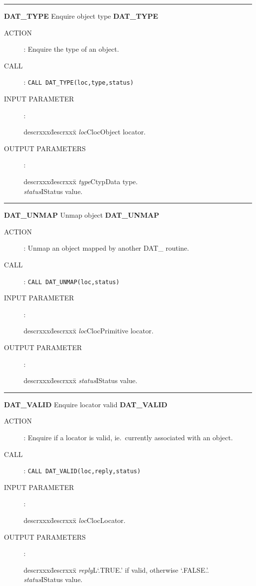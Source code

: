 \goodbreak
\rule{\textwidth}{0.3mm}
{\Large {\bf DAT\_TYPE} \hfill Enquire object type \hfill {\bf DAT\_TYPE}}
\begin{description}
\item [ACTION]:
Enquire the type of an object.
\item [CALL]:
{\tt CALL DAT\_TYPE(loc,type,status)}
\item [INPUT PARAMETER]:
\begin{tabbing}
descrxxx\=descrxxx\=\kill
{\em loc}\>Cloc\>Object locator.
\end{tabbing}
\item [OUTPUT PARAMETERS]:
\begin{tabbing}
descrxxx\=descrxxx\=\kill
{\em type}\>Ctyp\>Data type.\\
{\em status}\>I\>Status value.
\end{tabbing}
\end{description}
\goodbreak
\rule{\textwidth}{0.3mm}
{\Large {\bf DAT\_UNMAP} \hfill Unmap object \hfill {\bf DAT\_UNMAP}}
\begin{description}
\item [ACTION]:
Unmap an object mapped by another DAT\_ routine.
\item [CALL]:
{\tt CALL DAT\_UNMAP(loc,status)}
\item [INPUT PARAMETER]:
\begin{tabbing}
descrxxx\=descrxxx\=\kill
{\em loc}\>Cloc\>Primitive locator.
\end{tabbing}
\item [OUTPUT PARAMETER]:
\begin{tabbing}
descrxxx\=descrxxx\=\kill
{\em status}\>I\>Status value.
\end{tabbing}
\end{description}
\goodbreak
\rule{\textwidth}{0.3mm}
{\Large {\bf DAT\_VALID} \hfill Enquire locator valid \hfill {\bf DAT\_VALID}}
\begin{description}
\item [ACTION]:
Enquire if a locator is valid, ie.\ currently associated with an object.
\item [CALL]:
{\tt CALL DAT\_VALID(loc,reply,status)}
\item [INPUT PARAMETER]:
\begin{tabbing}
descrxxx\=descrxxx\=\kill
{\em loc}\>Cloc\>Locator.
\end{tabbing}
\item [OUTPUT PARAMETERS]:
\begin{tabbing}
descrxxx\=descrxxx\=\kill
{\em reply}\>L\>`.TRUE.' if valid, otherwise `.FALSE.'.\\
{\em status}\>I\>Status value.
\end{tabbing}
\end{description}
